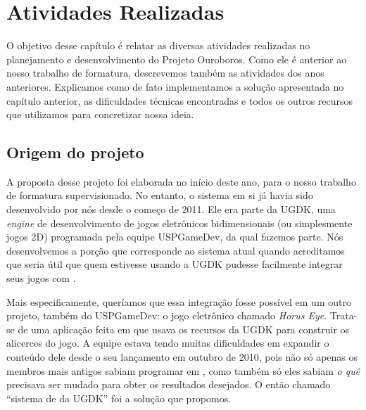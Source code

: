 \def\classname#1{\texttt{#1}}

\chapter{Atividades Realizadas}
\label{sec:atividades}

  O objetivo desse capítulo é relatar as diversas atividades realizadas no
  planejamento e desenvolvimento do Projeto Ouroboros. Como ele é anterior ao
  nosso trabalho de formatura, descrevemos também as atividades dos anos
  anteriores. Explicamos como de fato implementamos a solução apresentada no
  capítulo anterior, as dificuldades técnicas encontradas e todos os outros
  recursos que utilizamos para concretizar nossa ideia.
  
  \section{Origem do projeto}
  \label{sec:atividades:origem}
  
    A proposta desse projeto foi elaborada no início deste ano, para o nosso
    trabalho de formatura supervisionado. No entanto, o sistema em si já havia
    sido desenvolvido por nós desde o começo de 2011. Ele era parte da UGDK, uma
    \emph{engine} de desenvolvimento de jogos eletrônicos bidimensionais (ou
    simplesmente jogos 2D) programada pela equipe USPGameDev, da qual
    fazemos parte\footnotemark. Nós desenvolvemos a porção que corresponde ao
    sistema atual quando acreditamos que seria útil que quem estivesse usando a
    UGDK pudesse facilmente integrar seus jogos com .


    Mais especificamente, queríamos que essa integração fosse possível em um
    outro projeto, também do USPGameDev: o jogo eletrônico chamado \emph{Horus
    Eye}\footnotemark. Trata-se de uma aplicação feita em \CXX{} que usava os
    recursos da UGDK para construir os alicerces do jogo. A equipe estava tendo
    muitas dificuldades em expandir o conteúdo dele desde o seu lançamento em
    outubro de 2010, pois não só apenas os membros mais antigos sabiam programar
    em \CXX{}, como também só eles sabiam \emph{o quê} precisava ser mudado para
    obter os resultados desejados. O então chamado ``sistema de  da
    UGDK'' foi a solução que propomos.

